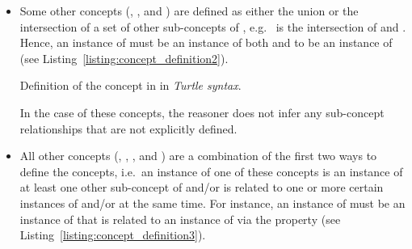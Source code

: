 \begin{itemize}
  \item Some other concepts (, , and ) are defined as either the union or the intersection of a set of other sub-concepts of , e.g.\  is the intersection of  and . Hence, an instance of  must be an instance of both  and  to be an instance of  (see Listing~\ref{listing:concept_definition2}).
  
\begin{mintlisting}

\caption[Definition of the concept ]{Definition of the concept  in \smarthomeweather in \emph{Turtle syntax}.}
\label{listing:concept_definition2}
\end{mintlisting}
  
  In the case of these concepts, the  reasoner does not infer any sub-concept relationships that are not explicitly defined.
  
  \item All other concepts (, , , and ) are a combination of the first two ways to define the concepts, i.e.\ an instance of one of these concepts is an instance of at least one other sub-concept of  and/or is related to one or more certain instances of  and/or  at the same time. For instance, an instance of  must be an instance of  that is related to an instance of  via the property  (see Listing~\ref{listing:concept_definition3}).
  

\end{itemize}
